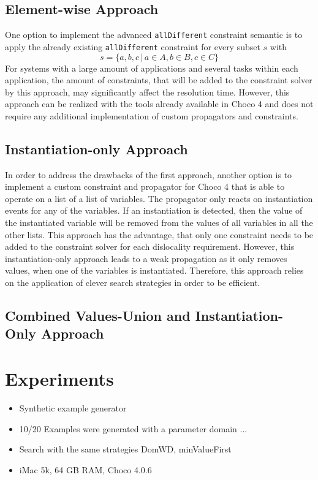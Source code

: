 \documentclass[english,biblatex]{lni}
\begin{document}
\subsection*{Element-wise Approach}

One option to implement the advanced \texttt{allDifferent} constraint semantic is to apply the already existing \texttt{allDifferent} constraint for every subset $s$ with
$$s = \{a,b,c \, \vert \, a \in A,  b \in B, c \in C\}$$
For systems with a large amount of applications and several tasks within each application, the amount of constraints, that will be added to the constraint solver by this approach, may significantly affect the resolution time.
However, this approach can be realized with the tools already available in Choco 4 and does not require any additional implementation of custom propagators and constraints.

\subsection*{Instantiation-only Approach}

In order to address the drawbacks of the first approach, another option is to implement a custom constraint and propagator for Choco 4 that is able to operate on a list of a list of variables.
The propagator only reacts on instantiation events for any of the variables.
If an instantiation is detected, then the value of the instantiated variable will be removed from the values of all variables in all the other lists.
This approach has the advantage, that only one constraint needs to be added to the constraint solver for each dislocality requirement.
However, this instantiation-only approach leads to a weak propagation as it only removes values, when one of the variables is instantiated.
Therefore, this approach relies on the application of clever search strategies in order to be efficient.

\subsection*{Combined Values-Union and Instantiation-Only Approach}



\section{Experiments}

\begin{itemize}
\item Synthetic example generator 
\item 10/20 Examples were generated with a parameter domain ...
\item Search with the same strategies DomWD, minValueFirst
\item iMac 5k, 64 GB RAM, Choco 4.0.6
\end{itemize}
\end{document}
